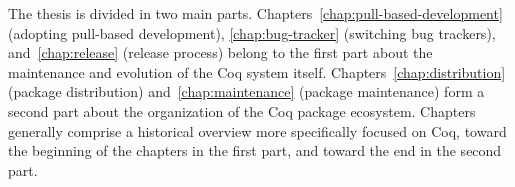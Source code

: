 The thesis is divided in two main parts.
Chapters~\ref{chap:pull-based-development} (adopting pull-based development), \ref{chap:bug-tracker} (switching bug trackers), and~\ref{chap:release} (release process) belong to the first part about the maintenance and evolution of the Coq system itself.
Chapters~\ref{chap:distribution} (package distribution) and~\ref{chap:maintenance} (package maintenance) form a second part about the organization of the Coq package ecosystem.
Chapters generally comprise a historical overview more specifically focused on Coq, toward the beginning of the chapters in the first part, and toward the end in the second part.

